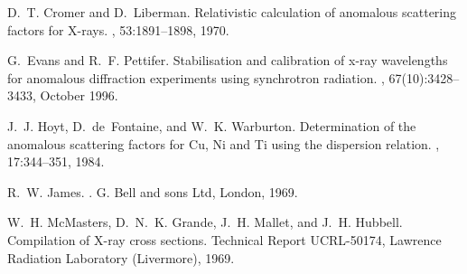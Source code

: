 \documentclass[a4paper]{article}
\begin{document}
%
\begin{thebibliography}{1}

D.~T. Cromer and D.~Liberman.
\newblock Relativistic calculation of anomalous scattering factors for
  {X}-rays.
, 53:1891--1898, 1970.

G.~Evans and R.~F. Pettifer.
\newblock Stabilisation and calibration of x-ray wavelengths for anomalous
  diffraction experiments using synchrotron radiation.
, 67(10):3428--3433, October 1996.

J.~J. Hoyt, D.~de~Fontaine, and W.~K. Warburton.
\newblock Determination of the anomalous scattering factors for {C}u, {N}i and
  {T}i using the dispersion relation.
, 17:344--351, 1984.

R.~W. James.
.
\newblock G. Bell and sons Ltd, London, 1969.

W.~H. McMasters, D.~N.~K. Grande, J.~H. Mallet, and J.~H. Hubbell.
\newblock Compilation of {X}-ray cross sections.
\newblock Technical Report UCRL-50174, Lawrence Radiation Laboratory
  (Livermore), 1969.

\end{thebibliography}
\end{document}
